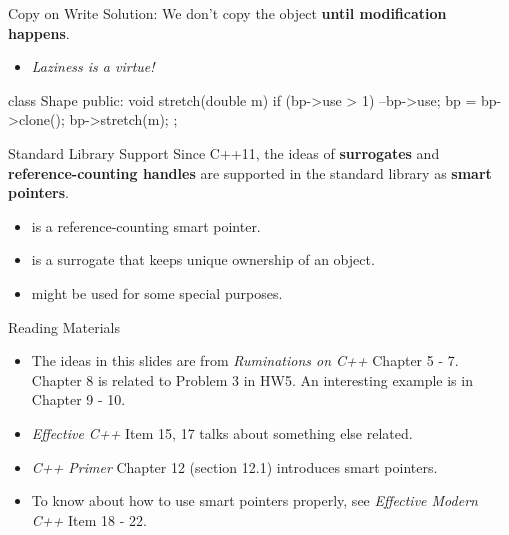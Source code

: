 \documentclass{beamer}
\begin{document}
\begin{frame}[fragile]{Copy on Write}
    Solution: We don't copy the object \textbf{until modification happens}.
    \begin{itemize}
        \item \textit{Laziness is a virtue!}
    \end{itemize}
    \begin{cpp}
class Shape {
 public:
  void stretch(double m) {
    if (bp->use > 1) {
      --bp->use;
      bp = bp->clone();
    }
    bp->stretch(m);
  }
};
    \end{cpp}
\end{frame}

\begin{frame}{Standard Library Support}
    Since C++11, the ideas of \textbf{surrogates} and \textbf{reference-counting handles} are supported in the standard library  as \textbf{smart pointers}.
    \begin{itemize}
        \item {} is a reference-counting smart pointer.
        \item {} is a surrogate that keeps unique ownership of an object.
        \item {} might be used for some special purposes.
    \end{itemize}
\end{frame}

\begin{frame}{Reading Materials}
    \begin{itemize}
        \item The ideas in this slides are from \textit{Ruminations on C++} Chapter 5 - 7. Chapter 8 is related to Problem 3 in HW5. An interesting example is in Chapter 9 - 10.
        \item \textit{Effective C++} Item 15, 17 talks about something else related.
        \item \textit{C++ Primer} Chapter 12 (section 12.1) introduces smart pointers.
        \item To know about how to use smart pointers properly, see \textit{Effective Modern C++} Item 18 - 22.
    \end{itemize}
\end{frame}
\end{document}
